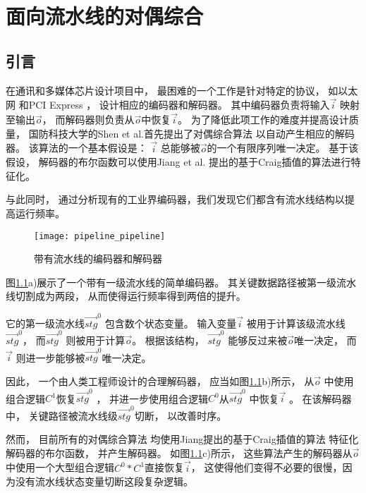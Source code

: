 \chapter{面向流水线的对偶综合}
\label{chap:5}

\section{引言}
在通讯和多媒体芯片设计项目中，
最困难的一个工作是针对特定的协议，
如以太网 和PCI Express ，
设计相应的编码器和解码器。
其中编码器负责将输入$\vec{i}$ 映射至输出$\vec{o}$，
而解码器则负责从$\vec{o}$中恢复$\vec{i}$。
为了降低此项工作的难度并提高设计质量，
国防科技大学的Shen et al.首先提出了对偶综合算法
以自动产生相应的解码器。
该算法的一个基本假设是：
$\vec{i}$ 总能够被$\vec{o}$的一个有限序列唯一决定。
基于该假设，
解码器的布尔函数可以使用Jiang et al. 提出的基于Craig插值的算法进行特征化。

与此同时，
通过分析现有的工业界编码器，我们发现它们都含有流水线结构以提高运行频率。
\begin{figure}[b]
\begin{center}
\texttt{[image: pipeline\_pipeline]}
\end{center}
\caption{带有流水线的编码器和解码器}
  \label{fig_pipe}
\end{figure}

图\ref{fig_pipe}a)展示了一个带有一级流水线的简单编码器。
其关键数据路径被第一级流水线切割成为两段，
从而使得运行频率得到两倍的提升。

它的第一级流水线$\vec{stg}^0$ 包含数个状态变量。
输入变量$\vec{i}$ 被用于计算该级流水线$\vec{stg}^0$，
而$\vec{stg}^0$ 则被用于计算$\vec{o}$。
根据该结构，
$\vec{stg}^0$ 能够反过来被$\vec{o}$唯一决定，
而$\vec{i}$ 则进一步能够被$\vec{stg}^0$唯一决定。

因此，
一个由人类工程师设计的合理解码器，
应当如图\ref{fig_pipe}b)所示，
从$\vec{o}$ 中使用组合逻辑$C^1$恢复$\vec{stg}^0$ ，
并进一步使用组合逻辑$C^0$从$\vec{stg}^0$ 中恢复$\vec{i}$ 。
在该解码器中，
关键路径被流水线级$\vec{stg}^0$切断，
以改善时序。



然而，
目前所有的对偶综合算法
均使用Jiang提出的基于Craig插值的算法 特征化解码器的布尔函数，
并产生解码器。
如图\ref{fig_pipe}c)所示，
这些算法产生的解码器从$\vec{o}$中使用一个大型组合逻辑$C^0*C^1$直接恢复$\vec{i}$，
这使得他们变得不必要的很慢，因为没有流水线状态变量切断这段复杂逻辑。

